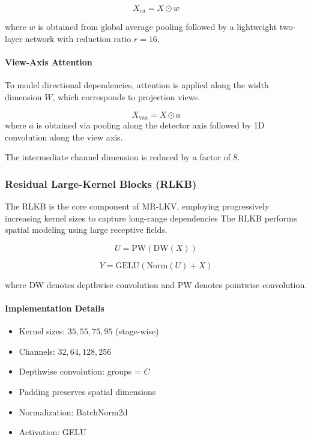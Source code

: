 \begin{equation}
X_{\mathrm{ca}} = X \odot w
\end{equation}

where $w$  is obtained from global average pooling followed by a lightweight two-layer network with reduction ratio $r = 16$.


\paragraph{View-Axis Attention}

To model directional dependencies, attention is applied along the width dimension $W$, which corresponds to projection views.

\begin{equation}
X_{\mathrm{vaa}} = X \odot a
\end{equation}
where $a$ is obtained via pooling along the detector axis followed by 1D convolution along the view axis.

The intermediate channel dimension is reduced by a factor of 8.

\subsubsection{Residual Large-Kernel Blocks (RLKB)}
The RLKB is the core component of MR-LKV, employing progressively increasing kernel sizes to capture long-range dependencies  
The RLKB performs spatial modeling using large receptive fields.

\begin{equation}
U = \mathrm{PW}(\mathrm{DW}(X))
\end{equation}

\begin{equation}
Y =
\mathrm{GELU}\left(
\mathrm{Norm}(U) + X
\right)
\end{equation}

where DW denotes depthwise convolution and PW denotes pointwise convolution.

\paragraph{Implementation Details}
\begin{itemize}
    \item Kernel sizes: $35, 55, 75, 95$ (stage-wise)
    \item Channels: $32, 64, 128, 256$
    \item Depthwise convolution: groups = $C$
    \item Padding preserves spatial dimensions
    \item Normalization: BatchNorm2d
    \item Activation: GELU
\end{itemize}

